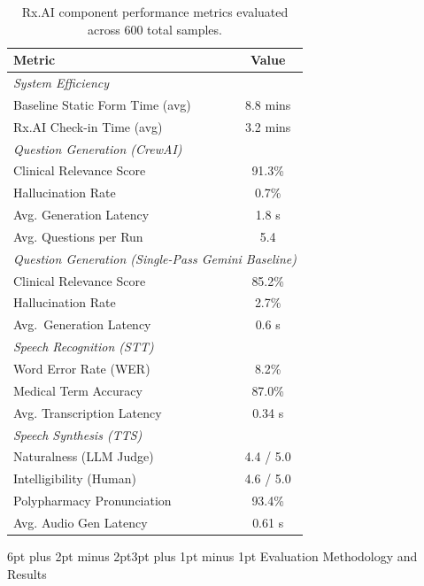 \documentclass[sigplan,screen]{acmart}
\makeatletter
\renewcommand{\section}{\@startsection{section}{1}{\z@}
  {6pt plus 2pt minus 2pt}{3pt plus 1pt minus 1pt}
  {\normalfont\large\bfseries}}
\makeatother
\begin{document}
\begin{table}[t]
\small
\caption{Rx.AI component performance metrics evaluated across 600 total samples.}
\label{tab:perf}
\begin{tabular}{lc}
\toprule
\textbf{Metric} & \textbf{Value} \\
\midrule
\multicolumn{2}{l}{\textit{System Efficiency}} \\
\quad Baseline Static Form Time (avg) & 8.8 mins \\
\quad Rx.AI Check-in Time (avg)       & 3.2 mins \\
\midrule
\multicolumn{2}{l}{\textit{Question Generation (CrewAI)}} \\
\quad Clinical Relevance Score        & 91.3\% \\
\quad Hallucination Rate              & 0.7\% \\
\quad Avg. Generation Latency         & 1.8 s \\
\quad Avg. Questions per Run          & 5.4 \\
\midrule
\multicolumn{2}{l}{\textit{Question Generation (Single-Pass Gemini Baseline)}} \\
\quad Clinical Relevance Score         & 85.2\%  \\
\quad Hallucination Rate               & 2.7\%   \\
\quad Avg.\ Generation Latency         & 0.6 s   \\
\midrule
\multicolumn{2}{l}{\textit{Speech Recognition (STT)}} \\
\quad Word Error Rate (WER)           & 8.2\% \\
\quad Medical Term Accuracy           & 87.0\% \\
\quad Avg. Transcription Latency      & 0.34 s \\
\midrule
\multicolumn{2}{l}{\textit{Speech Synthesis (TTS)}} \\
\quad Naturalness (LLM Judge)         & 4.4 / 5.0 \\
\quad Intelligibility (Human)         & 4.6 / 5.0 \\
\quad Polypharmacy Pronunciation      & 93.4\% \\
\quad Avg. Audio Gen Latency          & 0.61 s \\
\bottomrule
\end{tabular}
\end{table}

\section{Evaluation Methodology and Results}
\end{document}
